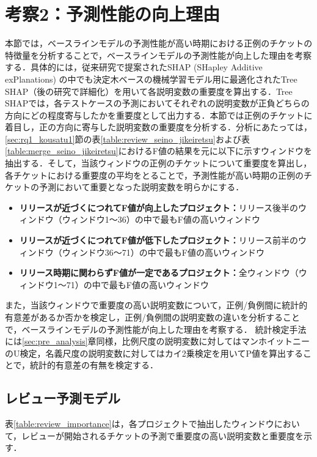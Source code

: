 \documentclass[11pt]{jreport}
\begin{document}
\section{考察2：予測性能の向上理由}\label{sec:rq1_kousatu2}
本節では，ベースラインモデルの予測性能が高い時期における正例のチケットの特徴量を分析することで，ベースラインモデルの予測性能が向上した理由を考察する．具体的には，従来研究\cite{shap}で提案されたSHAP (SHapley Additive exPlanations) の中でも決定木ベースの機械学習モデル用に最適化されたTree SHAP（後の研究\cite{TreeSHAP}で詳細化）を用いて各説明変数の重要度を算出する．Tree SHAPでは，各テストケースの予測においてそれぞれの説明変数が正負どちらの方向にどの程度寄与したかを重要度として出力する．本節では正例のチケットに着目し，正の方向に寄与した説明変数の重要度を分析する．分析にあたっては，\ref{sec:rq1_kousatu1}節の表\ref{table:review_seino_jikeiretsu}および表\ref{table:merge_seino_jikeiretsu}におけるF値の結果を元に以下に示すウィンドウを抽出する．そして，当該ウィンドウの正例のチケットについて重要度を算出し，各チケットにおける重要度の平均をとることで，予測性能が高い時期の正例のチケットの予測において重要となった説明変数を明らかにする．

\begin{itemize}
  \item \textbf{リリースが近づくにつれてF値が向上したプロジェクト：}リリース後半のウィンドウ（ウィンドウ1〜36）の中で最もF値の高いウィンドウ
  \item \textbf{リリースが近づくにつれてF値が低下したプロジェクト：}リリース前半のウィンドウ（ウィンドウ36〜71）の中で最もF値の高いウィンドウ
  \item \textbf{リリース時期に関わらずF値が一定であるプロジェクト：}全ウィンドウ（ウィンドウ1〜71）の中で最もF値の高いウィンドウ
\end{itemize}

また，当該ウィンドウで重要度の高い説明変数について，正例/負例間に統計的有意差があるか否かを検定し，正例/負例間の説明変数の違いを分析することで，ベースラインモデルの予測性能が向上した理由を考察する．
統計検定手法には\ref{sec:pre_analysis}章同様，比例尺度の説明変数に対してはマンホイットニーのU検定，名義尺度の説明変数に対してはカイ2乗検定を用いてP値を算出することで，統計的有意差の有無を検定する．


\subsection{レビュー予測モデル}\label{sec:rq1_kousatu2_review}
表\ref{table:review_importance}は，各プロジェクトで抽出したウィンドウにおいて，レビューが開始されるチケットの予測で重要度の高い説明変数と重要度を示す．
\end{document}
